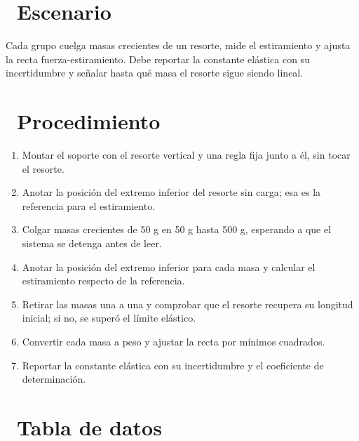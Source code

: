 \documentclass[11pt,a4paper]{article}
\newcommand{\iconotexto}[2]{\textcolor{cyanNeon}{\faIcon{#1}}~#2}
\begin{document}
\section{\iconotexto{flask}{Escenario}}

Cada grupo cuelga masas crecientes de un resorte, mide el estiramiento y ajusta la recta fuerza-estiramiento. Debe reportar la constante elástica con su incertidumbre y señalar hasta qué masa el resorte sigue siendo lineal.

\section{\iconotexto{list-ol}{Procedimiento}}

\begin{enumerate}[leftmargin=1.4em,itemsep=2pt,topsep=3pt]
  \item Montar el soporte con el resorte vertical y una regla fija junto a él, sin tocar el resorte.
  \item Anotar la posición del extremo inferior del resorte sin carga; esa es la referencia para el estiramiento.
  \item Colgar masas crecientes de 50 g en 50 g hasta 500 g, esperando a que el sistema se detenga antes de leer.
  \item Anotar la posición del extremo inferior para cada masa y calcular el estiramiento respecto de la referencia.
  \item Retirar las masas una a una y comprobar que el resorte recupera su longitud inicial; si no, se superó el límite elástico.
  \item Convertir cada masa a peso y ajustar la recta por mínimos cuadrados.
  \item Reportar la constante elástica con su incertidumbre y el coeficiente de determinación.
\end{enumerate}

\section{\iconotexto{table}{Tabla de datos}}
\end{document}
